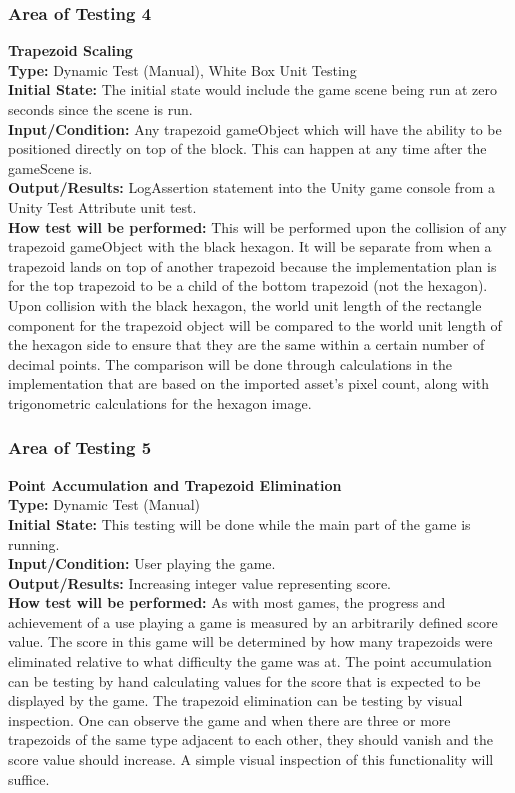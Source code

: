 \documentclass[12pt, titlepage]{article}
\begin{document}
\subsubsection{Area of Testing 4}
\noindent \textbf{Trapezoid Scaling} \\
\textbf{Type:} Dynamic Test (Manual), White Box Unit Testing\\
\textbf{Initial State:} The initial state would include the game scene being run at zero seconds since the scene is run. \\
\textbf{Input/Condition:} Any trapezoid gameObject which will have the ability to be positioned directly on top of the block. This can happen at any time after the gameScene is. \\
\textbf{Output/Results:}  LogAssertion statement into the Unity game console from a Unity Test Attribute unit test.\\
\textbf{How test will be performed:} This will be performed upon the collision of any trapezoid gameObject with the black hexagon. It will be separate from when a trapezoid lands on top of another trapezoid because the implementation plan is for the top trapezoid to be a child of the bottom trapezoid (not the hexagon). Upon collision with the black hexagon, the world unit length of the rectangle component for the trapezoid object will be compared to the world unit length of the hexagon side to ensure that they are the same within a certain number of decimal points. The comparison will be done through calculations in the implementation that are based on the imported asset’s pixel count, along with trigonometric calculations for the hexagon image. 

\subsubsection{Area of Testing 5}
\noindent \textbf{Point Accumulation and Trapezoid Elimination} \\
\textbf{Type:} Dynamic Test (Manual)\\
\textbf{Initial State:} This testing will be done while the main part of the game is running.\\
\textbf{Input/Condition:} User playing the game.\\
\textbf{Output/Results:} Increasing integer value representing score. \\
\textbf{How test will be performed:} As with most games, the progress and achievement of a use playing a game is measured by an arbitrarily defined score value. The score in this game will be determined by how many trapezoids were eliminated relative to what difficulty the game was at. The point accumulation can be testing by hand calculating  values for the score that is expected to be displayed by the game. The trapezoid elimination can be testing by visual inspection. One can observe the game and when there are three or more trapezoids of the same type adjacent to each other, they should vanish and the score value should increase. A simple visual inspection of this functionality will suffice.
\end{document}

